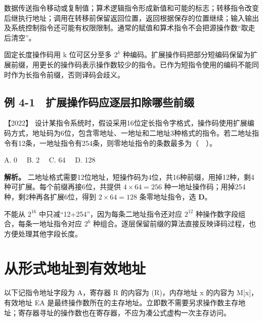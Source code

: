 数据传送指令移动或复制值；算术逻辑指令形成新值和可能的标志；转移指令改变后继执行地址；调用在转移前保留返回位置，返回根据保存的位置继续；输入输出及系统控制指令还可能有权限限制。通常的赋值和算术指令不会把源操作数``取走后清空''。

固定长度操作码用 k 位可区分至多 \(2^k\) 种编码。扩展操作码把部分短编码保留为扩展前缀，用更长的操作码表示操作数较少的指令。已作为短指令使用的编码不能同时作为长指令前缀，否则译码会歧义。

\subsection{例 4-1　扩展操作码应逐层扣除哪些前缀}\label{co-ex4-1}

\noindent{}【2022】 设计某指令系统时，假设采用16位定长指令字格式，操作码使用扩展编码方式，地址码为6位，包含零地址、一地址和二地址3种格式的指令。若二地址指令有12条，一地址指令有254条，则零地址指令的条数最多为（　）。

A. 0　 B. 2　 C. 64　 D. 128


\textbf{解析。} 二地址格式需要12位地址，短操作码为4位，共16种前缀，用掉12种，剩4种可扩展。每个前缀再接6位，共提供 \(4\times64=256\) 种一地址操作码；用掉254种，剩2种再各扩展6位，得到 \(2\times64=128\) 条零地址指令，选 \textbf{D}。

不能从 \(2^{16}\) 中只减``12+254''，因为每条二地址指令还对应 \(2^{12}\) 种操作数字段组合，每条一地址指令对应 \(2^6\) 种组合。逐层保留前缀的算法直接反映译码过程，也方便处理其他字段长度。

\section{从形式地址到有效地址}\label{co-04-02}

以下记指令地址字段为 A，寄存器 R 的内容为 (R)，内存地址 x 的内容为 M{[}x{]}，有效地址 EA 是最终操作数所在的主存地址。立即数不需要另求操作数主存地址；寄存器寻址的操作数也在寄存器，不应为凑公式虚构一次主存访问。

